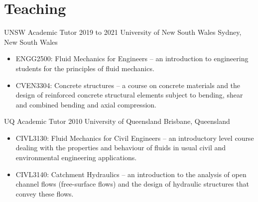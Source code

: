 
\section{Teaching}


	\entrytable%
	{UNSW Academic Tutor}
	{2019 to 2021}
	{}
	{University of New South Wales}
	{Sydney, New South Wales}
	{\begin{itemize}
			\item ENGG2500: Fluid Mechanics for Engineers -- an introduction to engineering students for the principles of fluid mechanics.
			\item CVEN3304: Concrete structures -- a course on concrete materials and the design of reinforced concrete structural elements subject to bending, shear and combined bending and axial compression.

		\end{itemize}
	}

	\entrytable%
	{UQ Academic Tutor}
	{2010}
	{}
	{University of Queensland}
	{Brisbane, Queensland}
	{\begin{itemize}
			\item CIVL3130: Fluid Mechanics for Civil Engineers -- an introductory level course dealing with the properties and behaviour of fluids in usual civil and environmental engineering applications.
			 \item CIVL3140: Catchment Hydraulics -- an introduction to the analysis of open channel flows (free-surface flows) and the design of hydraulic structures that convey these flows.
		\end{itemize}
	}
